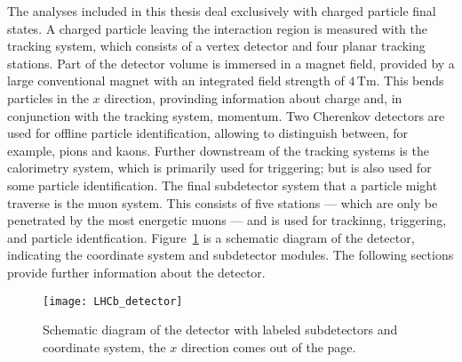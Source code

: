 
The analyses included in this thesis deal exclusively with charged particle final states.
A charged particle leaving the interaction region is measured with the tracking system, which
consists of a vertex detector and four planar tracking stations.
Part of the detector volume is immersed in a magnet field, provided by a large conventional magnet
with an integrated field strength of $4\,\mathrm{Tm}$.
This bends particles in the $x$ direction, provinding information about charge and, in conjunction
with the tracking system, momentum.
Two Cherenkov detectors are used for offline particle identification, allowing \lhcb to distinguish
between, for example, pions and kaons.
Further downstream of the tracking systems is the calorimetry system, which is primarily used for
triggering; but is also used for some particle identification.
The final subdetector system that a particle might traverse is the muon system.
This consists of five stations --- which are only be penetrated by the most energetic muons --- and
is used for trackinng, triggering, and particle identfication.
Figure~\ref{fig:lhcb:lhcb} is a schematic diagram of the \lhcb detector, indicating the coordinate
system and subdetector modules.
The following sections provide further information about the \lhcb detector.


\begin{figure}
  \begin{center}
    \texttt{[image: LHCb\_detector]}
  \end{center}
  \caption[Diagram of the LHCb detector]
  {\small
    Schematic diagram of the \lhcb detector with labeled subdetectors and coordinate system, the
    $x$ direction comes out of the page.
  }
  \label{fig:lhcb:lhcb}
\end{figure}

